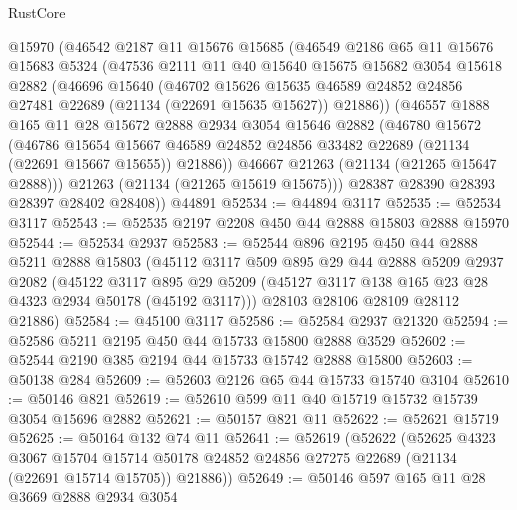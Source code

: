 \begin{lexlean}{RustCore}
\begin{coremodule}
    @15970
    (@46542
      @2187
      @11
      @15676
      @15685
      (@46549
        @2186
        @65
        @11
        @15676
        @15683
        @5324
        (@47536
          @2111
          @11
          @40
          @15640
          @15675
          @15682
          @3054
          @15618
          @2882
          (@46696
            @15640
            (@46702
              @15626
              @15635
              @46589
              @24852
              @24856
              @27481
              @22689
              (@21134 (@22691 @15635 @15627))
              @21886))
          (@46557
            @1888
            @165
            @11
            @28
            @15672
            @2888
            @2934
            @3054
            @15646
            @2882
            (@46780
              @15672
              (@46786
                @15654
                @15667
                @46589
                @24852
                @24856
                @33482
                @22689
                (@21134 (@22691 @15667 @15655))
                @21886))
            @46667
            @21263
            (@21134 (@21265 @15647 @2888)))
          @21263
          (@21134 (@21265 @15619 @15675)))
        @28387
        @28390
        @28393
        @28397
        @28402
        @28408))
    @44891
@52534 := @44894 @3117
@52535 := @52534 @3117
@52543 := @52535 @2197 @2208 @450 @44 @2888 @15803 @2888 @15970
@52544 := @52534 @2937
@52583 := @52544
    @896
    @2195
    @450
    @44
    @2888
    @5211
    @2888
    @15803
    (@45112
      @3117
      @509
      @895
      @29
      @44
      @2888
      @5209
      @2937
      @2082
      (@45122
        @3117
        @895
        @29
        @5209
        (@45127 @3117 @138 @165 @23 @28 @4323 @2934 @50178 (@45192 @3117)))
      @28103
      @28106
      @28109
      @28112
      @21886)
@52584 := @45100 @3117
@52586 := @52584 @2937 @21320
@52594 := @52586 @5211 @2195 @450 @44 @15733 @15800 @2888 @3529
@52602 := @52544 @2190 @385 @2194 @44 @15733 @15742 @2888 @15800
@52603 := @50138 @284
@52609 := @52603 @2126 @65 @44 @15733 @15740 @3104
@52610 := @50146 @821
@52619 := @52610 @599 @11 @40 @15719 @15732 @15739 @3054 @15696 @2882
@52621 := @50157 @821 @11
@52622 := @52621 @15719
@52625 := @50164 @132 @74 @11
@52641 := @52619
    (@52622
      (@52625
        @4323
        @3067
        @15704
        @15714
        @50178
        @24852
        @24856
        @27275
        @22689
        (@21134 (@22691 @15714 @15705))
        @21886))
@52649 := @50146 @597 @165 @11 @28 @3669 @2888 @2934 @3054

\end{coremodule}
\end{lexlean}
